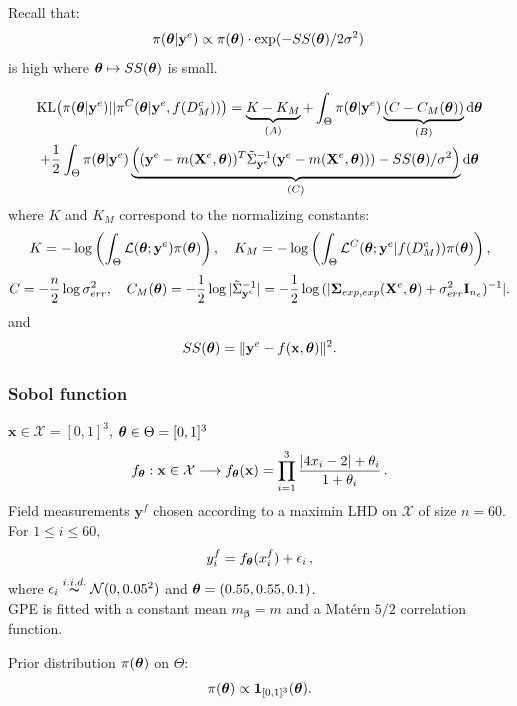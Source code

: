 \documentclass[nopagenumber,9pt]{beamer}
\newcommand{\mb}[1]{\mathbf{#1}}
\newcommand{\ms}[1]{\boldsymbol{#1}}
\begin{document}
\begin{frame}
 \frametitle{}
 
 {\small
 \begin{beamerboxesrounded}{}
Recall that:
$$\pi(\boldsymbol{\theta}|\mathbf{y}^{e})\propto \pi(\boldsymbol{\theta})\cdot \exp(-SS(\boldsymbol{\theta})/2\sigma^2)\,$$
is high where $\boldsymbol{\theta}\mapsto SS(\boldsymbol{\theta})$ is small.  
 \end{beamerboxesrounded}
 \begin{multline}
 \nonumber
\label{KL_expression_dev}
\textrm{KL}\big(\pi(\boldsymbol{\theta}|\mathbf{y}^{e})||\pi^{C}(\boldsymbol{\theta}|\mathbf{y}^{e},f(D^c_M))\big)=
\underbrace{K-K_M}_{(A)}+
\int_{\Theta}\pi(\boldsymbol{\theta}|\mathbf{y}^{e})\underbrace{(C-C_M(\boldsymbol{\theta}))}_{(B)}\mathrm{d}\boldsymbol{\theta}
\\+\frac{1}{2}\int_{\Theta}\pi(\boldsymbol{\theta}|\mathbf{y}^{e})
\underbrace{\Big((\mathbf{y}^{e}-m(\mathbf{X}^e,\boldsymbol{\theta}))^T\tilde\Sigma_{\mathbf{y}^{e}}^{-1}(\mathbf{y}^{e}-m(\mathbf{X}^e,\boldsymbol{\theta})))-SS(\boldsymbol{\theta})/\sigma^2\Big)}_{(C)}\mathrm{d}\boldsymbol{\theta}
\end{multline}
where $K$ and $K_M$ correspond to the normalizing constants:
\begin{equation}
\nonumber
K=-\log\left(\int_{\Theta}\mathcal{L}(\boldsymbol{\theta};\mathbf{y}^{e})\pi(\boldsymbol{\theta})\right),\quad K_M=-\log\left(\int_{\Theta}
\mathcal{L}^C(\boldsymbol{\theta};\mathbf{y}^{e}|f(D^c_M))\pi(\boldsymbol{\theta})\right),
\end{equation}
\begin{equation}
\nonumber
C=-\frac{n}{2}\log{\sigmaerr},\quad C_M(\btheta)=-\frac{1}{2}\log{|\tilde\Sigma_{\byexp}^{-1}|}=-\frac{1}{2}\log{(|\boldsymbol{\Sigma}_{exp,exp}(\bXexp,\btheta)+\sigmaerr\mb{I}_{\nexp})^{-1}|}.
\end{equation}
and
\begin{equation}
\nonumber
SS(\boldsymbol{\theta})=\Vert \mathbf{y}^{e} - f(\mathbf{x},\boldsymbol{\theta}) \Vert^2.
\end{equation}
}
\end{frame}


\begin{frame}
 \frametitle{Sobol function}
 $\mb{x}\in\mathcal{X}=[0,1]^{3}$, $\boldsymbol{\theta}\in\Theta=[0,1]^{3}$
 \begin{equation*}
\label{sobol}
f_{\btheta}:\mb{x}\in\mathcal{X}\longrightarrow
f_{\btheta}(\mb{x})=\prod_{i=1}^{3}\frac{|4x_i-2|+\theta_i}{1+\theta_i}\,.
\end{equation*}
Field measurements $\mb{y}^f$ chosen according to a maximin LHD on $\mathcal{X}$ of size $n=60$. 
For $1\leq i\leq 60$, 
\begin{equation*}
y^f_i=f_{\boldsymbol{\theta}}(x^f_i)+\epsilon_i\,,
\end{equation*}
where ${\epsilon_i}\overset{i.i.d.}{\thicksim}
\mathcal{N}(0,0.05^{2})$ and $\boldsymbol{\theta}=(0.55,0.55,0.1)$.\\

\medskip
GPE is fitted with a constant mean $m_{\ms{\beta}}=m$ and a Matérn $5/2$ correlation function. 

\medskip
Prior distribution $\pi(\boldsymbol{\theta})$ on $\Theta$:
\begin{equation*}
\pi({\btheta})\propto \mb{1}_{[0,1]^{3}}({\btheta}).
\end{equation*}
\end{frame}
\end{document}
